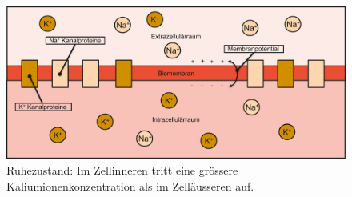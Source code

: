 \begin{figure}
    \centering
    \includegraphics[width=\textwidth]{papers/nerven/Bilder/Vorgang1.png}
    \caption{Ruhezustand: Im Zellinneren tritt eine grössere Kaliumionenkonzentration als im Zelläusseren auf.}
    \label{fig:Ruhezustand}
\end{figure}
